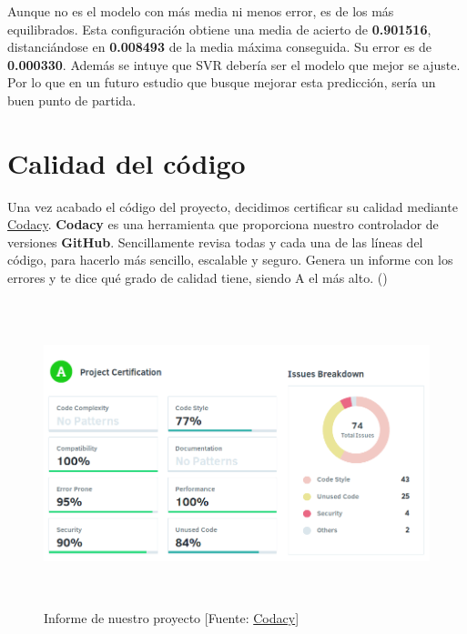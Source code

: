 Aunque no es el modelo con más media ni menos error, es de los más equilibrados. Esta configuración obtiene una media de acierto de \textbf{0.901516}, distanciándose en \textbf{0.008493} de la media máxima conseguida. Su error es de \textbf{0.000330}. Además se intuye que SVR debería ser el modelo que mejor se ajuste. Por lo que en un futuro estudio que busque mejorar esta predicción, sería un buen punto de partida.

\section{Calidad del código}
\label{makereference6.3}

Una vez acabado el código del proyecto, decidimos certificar su calidad mediante \href{https://www.codacy.com}{Codacy}.
\textbf{Codacy} es una herramienta que proporciona nuestro controlador de versiones \textbf{GitHub}. Sencillamente revisa todas y cada una de las líneas del código, para hacerlo más sencillo, escalable y seguro. Genera un informe con los errores y te dice qué grado de calidad tiene, siendo A el más alto. (\cite{ARP:Codacy:2017})
\begin{figure}[htb]
	\begin{center}
		\includegraphics[height=3.5in]{figures/codacy.png}
		\caption{Informe de nuestro proyecto [Fuente: \href{https://www.codacy.com}{Codacy}]}
	\end{center}
	
	\label{codacy}
\end{figure}